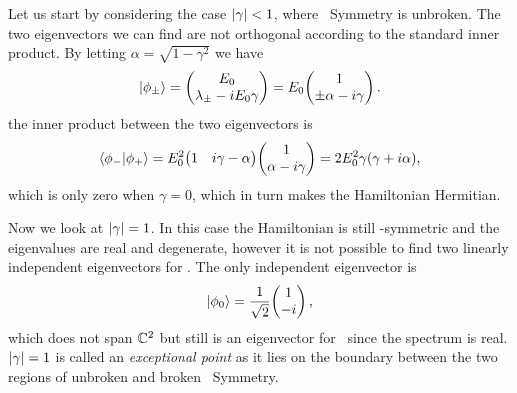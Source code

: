         Let us start by considering the case $\abs{\gamma} < 1$, where \PT\ Symmetry is unbroken. The two eigenvectors we can find are not orthogonal according to the standard inner product. By letting $\alpha = \sqrt{1 - \gamma^2}$ we have 
        \begin{equation*}
            \ket{\phi_\pm}
            = \pmqty{E_0 \\ \lambda_\pm - i E_0 \gamma}
            = E_0 \!\pmqty{1 \\ \pm \alpha - i \gamma}
            \myperiod
        \end{equation*}
        the inner product between the two eigenvectors is
        \begin{equation}
            \label{eq:ex:non-orthogonality}
            \bra{\phi_-}\ket{\phi_+}
            = E_0^2\! \pmqty{1 & i \gamma - \alpha}\!\pmqty{1 \\ \alpha -i \gamma}
            = 2 E_0^2 \gamma \pqty{\gamma + i \alpha}
            \mycomma
        \end{equation}
        which is only zero when $\gamma = 0$, which in turn makes the Hamiltonian Hermitian.

        Now we look at $\abs{\gamma} = 1$. In this case the Hamiltonian is still \PT-symmetric and the eigenvalues are real and degenerate, however it is not possible to find two linearly independent eigenvectors for \hH. The only independent eigenvector is
        \begin{equation*}
            \ket{\phi_0} = \frac{1}{\sqrt{2}}\! \pmqty{1 \\ -i}
            \mycomma
        \end{equation*}
        which does not span $\mathbb{C}^2$ but still is an eigenvector for \hPT\ since the spectrum is real. $\abs{\gamma} = 1$ is called an \emph{exceptional point} as it lies on the boundary between the two regions of unbroken and broken \PT\ Symmetry.

